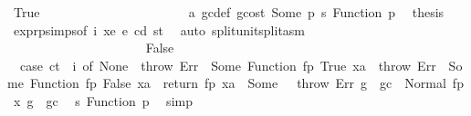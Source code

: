 \begin{isabellebody}
\ True\isanewline
\ \ \ \ \ \ \ \ \ \ \ \ \ \ \ \ \ \ \ \ \isamarkupfalse%
\ {}{}{\isacharparenleft}{\kern0pt}{}{\isacharparenright}{\kern0pt}\ a{}\ gc{\isacharunderscore}{\kern0pt}def\ gcost\ Some\ p{}\ s{}\ Function\ p{}\ \isamarkupfalse%
\ {\isacharquery}{\kern0pt}thesis\ \isamarkupfalse%
\ expr{\isachardot}{\kern0pt}psimps{\isacharparenleft}{\kern0pt}{}{}{\isacharparenright}{\kern0pt}{\isacharbrackleft}{\kern0pt}of\ i\ xe\ e\ cd\ st{\isacharbrackright}{\kern0pt}\ \isamarkupfalse%
\ {\isacharparenleft}{\kern0pt}auto\ split{\isacharcolon}{\kern0pt}unit{\isachardot}{\kern0pt}split{\isacharunderscore}{\kern0pt}asm{\isacharparenright}{\kern0pt}\isanewline
\ \ \ \ \ \ \ \ \ \ \ \ \ \ \ \ \ \ \isamarkupfalse%
\isanewline
\ \ \ \ \ \ \ \ \ \ \ \ \ \ \ \ \ \ \ \ \isamarkupfalse%
\ False\isanewline
\ \ \ \ \ \ \ \ \ \ \ \ \ \ \ \ \ \ \ \ \isamarkupfalse%
\ \isamarkupfalse%
\ {}{\isacharcolon}{\kern0pt}\ {\isachardoublequoteopen}{\isacharparenleft}{\kern0pt}case\ ct\ {\isachardollar}{\kern0pt}{\isachardollar}{\kern0pt}\ i\ of\ None\ {\isasymRightarrow}\ throw\ Err\ {\isacharbar}{\kern0pt}\ Some\ {\isacharparenleft}{\kern0pt}Function\ {\isacharparenleft}{\kern0pt}fp{\isacharcomma}{\kern0pt}\ True{\isacharcomma}{\kern0pt}\ xa{\isacharparenright}{\kern0pt}{\isacharparenright}{\kern0pt}\ {\isasymRightarrow}\ throw\ Err\ {\isacharbar}{\kern0pt}\ Some\ {\isacharparenleft}{\kern0pt}Function\ {\isacharparenleft}{\kern0pt}fp{\isacharcomma}{\kern0pt}\ False{\isacharcomma}{\kern0pt}\ xa{\isacharparenright}{\kern0pt}{\isacharparenright}{\kern0pt}\ {\isasymRightarrow}\ return\ {\isacharparenleft}{\kern0pt}fp{\isacharcomma}{\kern0pt}\ xa{\isacharparenright}{\kern0pt}\ {\isacharbar}{\kern0pt}\ Some\ {\isacharunderscore}{\kern0pt}\ {\isasymRightarrow}\ throw\ Err{\isacharparenright}{\kern0pt}\ {\isacharparenleft}{\kern0pt}g\ {\isacharminus}{\kern0pt}\ gc{\isacharparenright}{\kern0pt}\ {\isacharequal}{\kern0pt}\ Normal\ {\isacharparenleft}{\kern0pt}{\isacharparenleft}{\kern0pt}fp{\isacharcomma}{\kern0pt}\ x{\isacharparenright}{\kern0pt}{\isacharcomma}{\kern0pt}\ {\isacharparenleft}{\kern0pt}g\ {\isacharminus}{\kern0pt}\ gc{\isacharparenright}{\kern0pt}{\isacharparenright}{\kern0pt}{\isachardoublequoteclose}\ \isamarkupfalse%
\ s{}\ Function\ p{}\ \isamarkupfalse%
\ simp\isanewline

\end{isabellebody}
